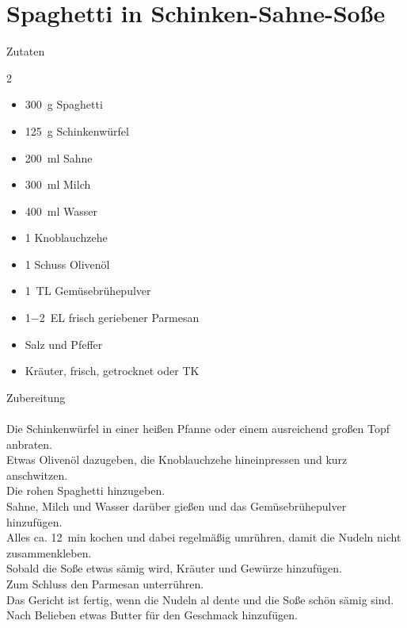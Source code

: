 \section*{Spaghetti in Schinken-Sahne-Soße} 
\ihead{}\ohead{} 
\cfoot{}

{\Large Zutaten} 
\begin{multicols}{2} 
\begin{itemize} 
  \item \SI{300}{g} Spaghetti 
  \item \SI{125}{g} Schinkenwürfel 
  \item \SI{200}{ml} Sahne 
  \item \SI{300}{ml} Milch 
  \item \SI{400}{ml} Wasser 
  \item \num{1} Knoblauchzehe 
  \item \num{1} Schuss Olivenöl 
  \item \SI{1}{TL} Gemüsebrühepulver 
  \item \SI{1-2}{EL} frisch geriebener Parmesan 
  \item Salz und Pfeffer 
  \item Kräuter, frisch, getrocknet oder TK 
\end{itemize} 
\end{multicols} 

\noindent
{\Large Zubereitung}\\
\\
Die Schinkenwürfel in einer heißen Pfanne oder einem ausreichend großen Topf anbraten.
\\ Etwas Olivenöl dazugeben, die Knoblauchzehe hineinpressen und kurz anschwitzen.
\\ Die rohen Spaghetti hinzugeben.
\\ Sahne, Milch und Wasser darüber gießen und das Gemüsebrühepulver hinzufügen.
\\ Alles ca. \SI{12}{min} kochen und dabei regelmäßig umrühren, damit die Nudeln nicht zusammenkleben.
\\ Sobald die Soße etwas sämig wird, Kräuter und Gewürze hinzufügen.
\\ Zum Schluss den Parmesan unterrühren.
\\ Das Gericht ist fertig, wenn die Nudeln al dente und die Soße schön sämig sind.
\\ Nach Belieben etwas Butter für den Geschmack hinzufügen.
